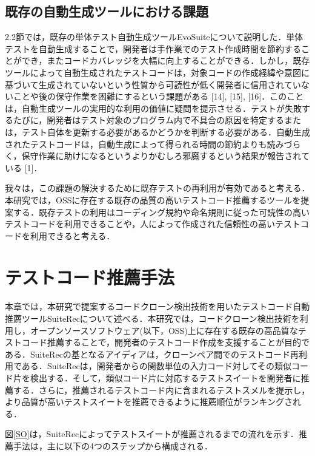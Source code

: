 \documentclass[12pt]{jarticle} %
\begin{document}
\subsection{既存の自動生成ツールにおける課題}

2.2節では，既存の単体テスト自動生成ツールEvoSuiteについて説明した．単体テストを自動生成することで，開発者は手作業でのテスト作成時間を節約することができ，またコードカバレッジを大幅に向上することができる．しかし，既存ツールによって自動生成されたテストコードは，対象コードの作成経緯や意図に基づいて生成されていないという性質から可読性が低く開発者に信用されていないことや後の保守作業を困難にするという課題がある [14], [15], [16]．このことは，自動生成ツールの実用的な利用の価値に疑問を提示させる．テストが失敗するたびに，開発者はテスト対象のプログラム内で不具合の原因を特定するまたは，テスト自体を更新する必要があるかどうかを判断する必要がある．自動生成されたテストコードは，自動生成によって得られる時間の節約よりも読みづらく，保守作業に助けになるというよりかむしろ邪魔するという結果が報告されている [1]．

我々は，この課題の解決するために既存テストの再利用が有効であると考える．本研究では，OSSに存在する既存の品質の高いテストコード推薦するツールを提案する．既存テストの利用はコーディング規約や命名規則に従った可読性の高いテストコードを利用できることや，人によって作成された信頼性の高いテストコードを利用できると考える．





\section{テストコード推薦手法}

本章では，本研究で提案するコードクローン検出技術を用いたテストコード自動推薦ツール{\sf SuiteRec}について述べる．本研究では，コードクローン検出技術を利用し，オープンソースソフトウェア(以下，OSS)上に存在する既存の高品質なテストコード推薦することで，開発者のテストコード作成を支援することが目的である．{\sf SuiteRec}の基となるアイディアは，クローンペア間でのテストコード再利用である．{\sf SuiteRec}は，開発者からの関数単位の入力コード対してその類似コード片を検出する．そして，類似コード片に対応するテストスイートを開発者に推薦する．さらに，推薦されるテストコード内に含まれるテストスメルを提示し，より品質が高いテストスイートを推薦できるように推薦順位がランキングされる．

図\ref{SO}は，SuiteRecによってテストスイートが推薦されるまでの流れを示す．推薦手法は，主に以下の4つのステップから構成される．
\end{document}
